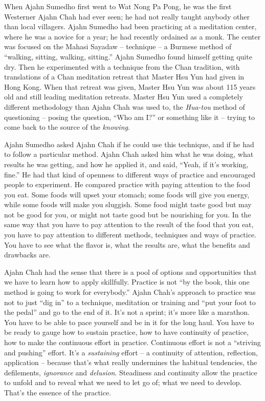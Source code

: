 When Ajahn Sumedho first went to Wat Nong Pa Pong, he was the first
Westerner Ajahn Chah had ever seen; he had not really taught anybody
other than local villagers. Ajahn Sumedho had been practicing at a
meditation center, where he was a novice for a year; he had recently
ordained as a monk. The center was focused on the Mahasi Sayadaw --
technique -- a Burmese method of ``walking, sitting, walking, sitting.''
Ajahn Sumedho found himself getting quite dry. Then he experimented with
a technique from the Chan tradition, with translations of a Chan
meditation retreat that Master Hsu Yun had given in Hong Kong.
When that retreat was given, Master Hsu Yun was about 115 years old and still leading
meditation retreats. Master Hsu Yun used a completely different
methodology than Ajahn Chah was used to, the \emph{Hua-tou} method of
questioning -- posing the question, ``Who am I?'' or something like it
-- trying to come back to the source of the \emph{knowing}. 

Ajahn Sumedho asked Ajahn Chah if he could use this technique, and if he
had to follow a particular method. Ajahn Chah asked him what he was
doing, what results he was getting, and how he applied it, and said, 
``Yeah, if it's working, fine.'' He had that kind of openness to
different ways of practice and encouraged people to experiment. He
compared practice with paying attention to the food you eat. Some foods
will upset your stomach; some foods will give you energy, while some
foods will make you sluggish. Some food might taste good but may not be
good for you, or might not taste good but be nourishing for you.  In the
same way that you have to pay attention to the result of the food that
you eat, you have to pay attention to different methods, techniques and
ways of practice. You have to see what the flavor is, what the results
are, what the benefits and drawbacks are. 

Ajahn Chah had the sense that there is a pool of options and
opportunities that we have to learn how to apply skillfully.  Practice
is not ``by the book, this one method is going to work for everybody.''
Ajahn Chah's approach to practice was not to just ``dig in'' to a
technique, meditation or training and ``put your foot to the pedal'' and
go to the end of it. It's not a sprint; it's more like a marathon. You
have to be able to pace yourself and be in it for the long haul. You
have to be ready to gauge how to sustain practice, how to have
continuity of practice, how to make the continuous effort in practice. 
Continuous effort is not a ``striving and pushing'' effort. It's a
\emph{sustaining} effort -- a continuity of attention, reflection, application
-- because that's what really undermines the habitual tendencies, the
defilements, \emph{ignorance} and \emph{delusion}. Steadiness and continuity allow the
practice to unfold and to reveal what we need to let go of; what we need
to develop. That's the essence of the practice. 

